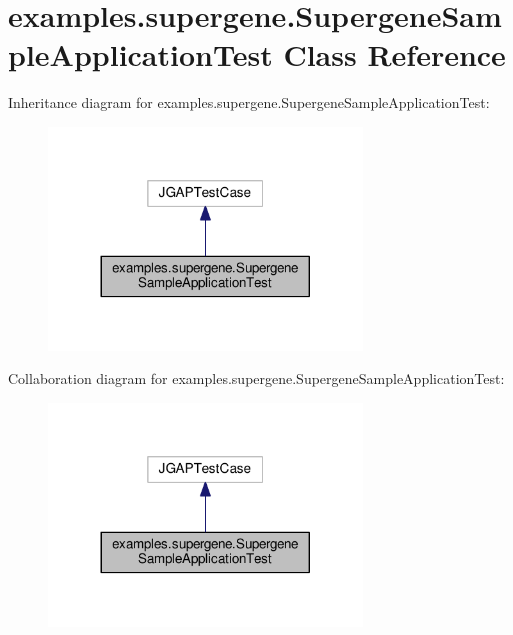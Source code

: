 \hypertarget{classexamples_1_1supergene_1_1_supergene_sample_application_test}{\section{examples.\-supergene.\-Supergene\-Sample\-Application\-Test Class Reference}
\label{classexamples_1_1supergene_1_1_supergene_sample_application_test}
}


Inheritance diagram for examples.\-supergene.\-Supergene\-Sample\-Application\-Test\-:
\nopagebreak
\begin{figure}[H]
\begin{center}
\leavevmode
\includegraphics[width=236pt]{classexamples_1_1supergene_1_1_supergene_sample_application_test__inherit__graph}
\end{center}
\end{figure}


Collaboration diagram for examples.\-supergene.\-Supergene\-Sample\-Application\-Test\-:
\nopagebreak
\begin{figure}[H]
\begin{center}
\leavevmode
\includegraphics[width=236pt]{classexamples_1_1supergene_1_1_supergene_sample_application_test__coll__graph}
\end{center}
\end{figure}
